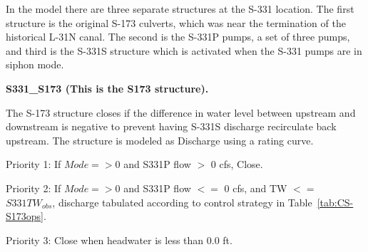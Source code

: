 In the model there are three separate structures at the S-331 location.
The first structure is the original S-173 culverts, which was near the termination of the historical L-31N canal.
The second is the S-331P pumps, a set of three pumps, and third is the S-331S structure which is activated when the S-331 pumps are in siphon mode.



\textbf{S331\_S173 (This is the S173 structure).}

The S-173 structure closes if the difference in water level between upstream and downstream is negative to prevent having S-331S discharge recirculate back upstream. The structure is modeled as Discharge using a rating curve.


\begin{packed_items}
\item Priority 1: If $Mode=>0$ and  S331P flow $>$ 0 cfs, Close. %
\item Priority 2: If $Mode=>0$ and  S331P flow $<=$ 0 cfs, and TW $<=$ $S331TW_{obs}$, discharge tabulated according to control strategy in Table~\ref{tab:CS-S173ops}.
\item Priority 3: Close when headwater is less than 0.0 ft.
\end{packed_items}

